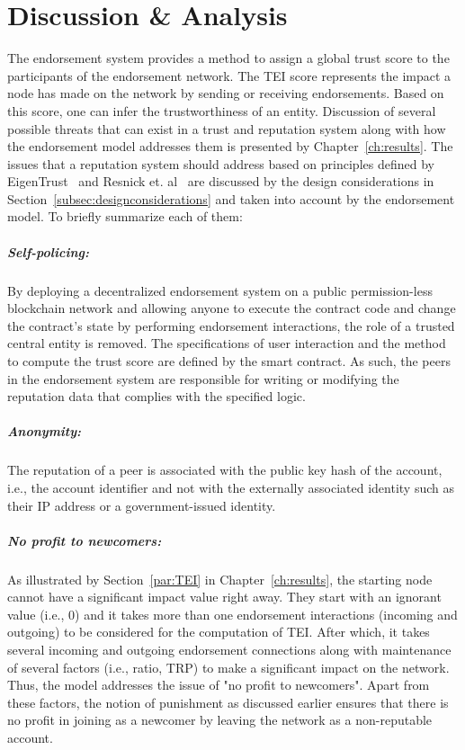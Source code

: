 \chapter{Discussion \& Analysis} \label{ch:discussion}
The endorsement system provides a method to assign a global trust score to the
participants of the endorsement network. The \ac{TEI} score represents the
impact a node has made on the network by sending or receiving endorsements.
Based on this score, one can infer the trustworthiness of an entity. Discussion
of several possible threats that can exist in a trust and reputation system
along with how the endorsement model addresses them is presented by
Chapter~\ref{ch:results}. The issues that a reputation system should address
based on principles defined by EigenTrust~\cite{kamvar2003eigentrust} and
Resnick et. al~\cite{resnick2000reputation} are discussed by the design
considerations in Section~\ref{subsec:designconsiderations} and taken into
account by the endorsement model. To briefly summarize each of them:  

\paragraph{Self-policing:}By deploying a decentralized endorsement system on a
public permission-less blockchain network and allowing anyone to execute the
contract code and change the contract's state by performing endorsement
interactions, the role of a trusted central entity is removed. The
specifications of user interaction and the method to compute the trust score
are defined by the smart contract. As such, the peers in the endorsement system
are responsible for writing or modifying the reputation data that complies with
the specified logic.   
\paragraph{Anonymity:} The reputation of a peer is associated with the public
key hash of the account, i.e., the account identifier and not with the
externally associated identity such as their IP address or a government-issued
identity.  
\paragraph{No profit to newcomers:}As illustrated by Section~\ref{par:TEI} in
Chapter~\ref{ch:results}, the starting node cannot have a significant impact
value right away. They start with an ignorant value (i.e., 0) and it takes more
than one endorsement interactions (incoming and outgoing) to be considered for
the computation of \ac{TEI}. After which, it takes several incoming and
outgoing endorsement connections along with maintenance of several factors
(i.e., ratio, \ac{TRP}) to make a significant impact on the network. Thus, the
model addresses the issue of "no profit to newcomers". Apart from these
factors, the notion of punishment as discussed earlier ensures that there is no
profit in joining as a newcomer by leaving the network as a non-reputable
account.   
